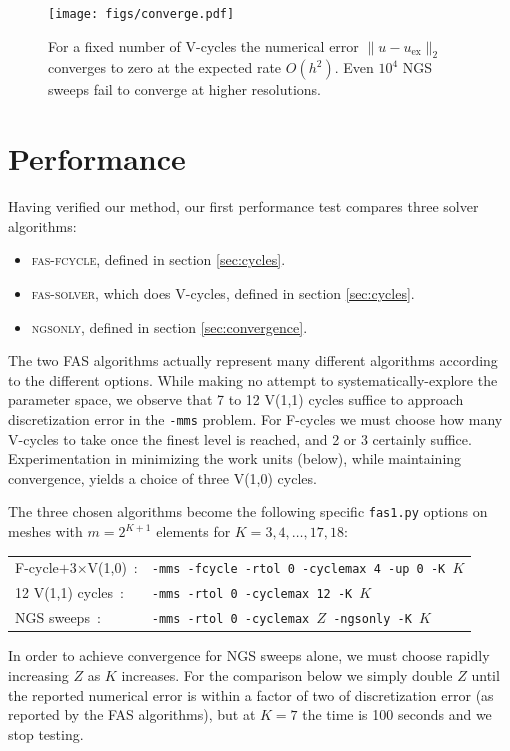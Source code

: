 \documentclass[letterpaper,final,12pt,reqno]{amsart}
\begin{document}
\begin{figure}
\texttt{[image: figs/converge.pdf]}
\caption{For a fixed number of V-cycles the numerical error $\|u-u_{\text{ex}}\|_2$ converges to zero at the expected rate $O(h^2)$.  Even $10^4$ NGS sweeps fail to converge at higher resolutions.}
\label{fig:converge}
\end{figure}


\section{Performance}  \label{sec:performance}

Having verified our method, our first performance test compares three solver algorithms:
\begin{itemize}
\item \textsc{fas-fcycle}, defined in section \ref{sec:cycles}.
\item \textsc{fas-solver}, which does V-cycles, defined in section \ref{sec:cycles}.
\item \textsc{ngsonly}, defined in section \ref{sec:convergence}.
\end{itemize}
The two FAS algorithms actually represent many different algorithms according to the different options.  While making no attempt to systematically-explore the parameter space, we observe that 7 to 12 V(1,1) cycles suffice to approach discretization error in the \texttt{-mms} problem.  For F-cycles we must choose how many V-cycles to take once the finest level is reached, and 2 or 3 certainly suffice.  Experimentation in minimizing the work units (below), while maintaining convergence, yields a choice of three V(1,0) cycles.

The three chosen algorithms become the following specific \texttt{fas1.py} options on meshes with $m=2^{K+1}$ elements for $K=3,4,\dots,17,18$:

\medskip
\begin{tabular}{ll}
\textsf{F-cycle$+$3$\times$V(1,0)} \,:        &\texttt{-mms -fcycle -rtol 0 -cyclemax 4 -up 0 -K }$K$ \\
\textsf{12 V(1,1) cycles} \,:  &\texttt{-mms -rtol 0 -cyclemax 12 -K }$K$ \\
\textsf{NGS sweeps} \,:      &\texttt{-mms -rtol 0 -cyclemax $Z$ -ngsonly -K }$K$
\end{tabular}

\medskip
In order to achieve convergence for NGS sweeps alone, we must choose rapidly increasing $Z$ as $K$ increases.  For the comparison below we simply double $Z$ until the reported numerical error is within a factor of two of discretization error (as reported by the FAS algorithms), but at $K=7$ the time is 100 seconds and we stop testing.
\end{document}
